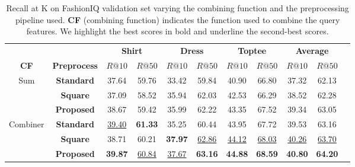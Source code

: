 \documentclass[acmlarge]{acmart}
\begin{document}
\begin{table}[tb]
\centering
\begin{tabular}{ccc  cc cc cc  cc}
\toprule
&&\multicolumn{2}{c}{\textbf{Shirt}} & \multicolumn{2}{c}{\textbf{Dress}} & \multicolumn{2}{c}{\textbf{Toptee}} & \multicolumn{2}{c}{\textbf{Average}}\\
\cmidrule(lr){3-4}
\cmidrule(lr){5-6}
  \cmidrule(lr){7-8}
  \cmidrule(lr){9-10}
\textbf{CF} & \textbf{Preprocess} & $R@10$ & $R@50$ &  $R@10$  & $R@50$ &  $R@10$  & $R@50$ &  $R@10$  & $R@50$  \\
\midrule
\multirow{3}{*}{Sum} & \textbf{Standard} & 37.64 & 59.76 & 33.42 & 59.84 & 40.90 & 66.80 & 37.32 & 62.13\\ &\textbf{Square} & 37.09 & 58.52 & 35.94 & 62.03 & 42.53 & 66.29 & 38.52 & 62.28\\ &\textbf{Proposed}  & 38.67 & 59.42 & 35.99 & 62.22 & 43.35 & 67.52 & 39.34 & 63.05 \\ \midrule[.02em]
\multirow{3}{*}{Combiner} & \textbf{Standard} & \underline{39.40} & \textbf{61.33} & 35.25 & 60.44 & 43.95 & 67.72 & 39.53 & 63.16\\ & \textbf{Square} & 38.71 & 60.21 & \textbf{37.97} & \underline{62.86} & \underline{44.12} & \underline{68.03} & \underline{40.26} & \underline{63.70}\\ & \textbf{Proposed} & \textbf{39.87} & \underline{60.84} & \underline{37.67} & \textbf{63.16} & \textbf{44.88} & \textbf{68.59} & \textbf{40.80} & \textbf{64.20} \\ \bottomrule
\end{tabular}


\caption{Recall at K on FashionIQ validation set varying the combining function and the preprocessing pipeline used. \textbf{CF} (combining function) indicates the function used to combine the query features. We highlight the best scores in bold and underline the second-best scores.}
\label{tab:fashioniq-preprocess}
\vspace{-3ex}
\end{table}
\end{document}
